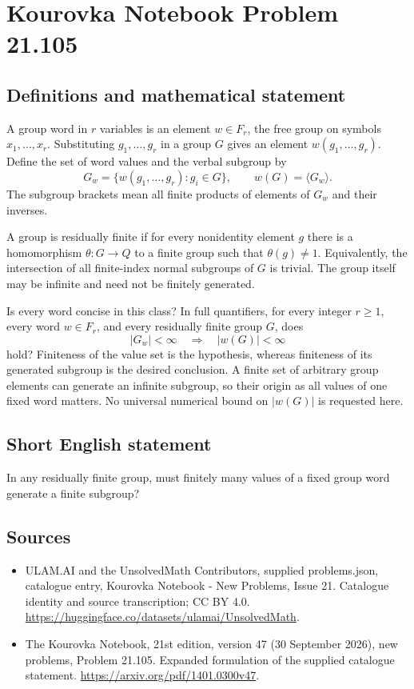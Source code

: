 \documentclass[11pt,a4paper]{article}
\begin{document}
\section*{Kourovka Notebook Problem 21.105}\label{statement}

\subsection{Definitions and mathematical statement}
A group word in $r$ variables is an element $w\in F_r$, the free group on symbols $x_1,\ldots,x_r$. Substituting $g_1,\ldots,g_r$ in a group $G$ gives an element $w(g_1,\ldots,g_r)$. Define the set of word values and the verbal subgroup by
\[
 G_w=\{w(g_1,\ldots,g_r):g_i\in G\},\qquad
 w(G)=\langle G_w\rangle.
\]
The subgroup brackets mean all finite products of elements of $G_w$ and their inverses.

A group is residually finite if for every nonidentity element $g$ there is a homomorphism $\theta:G\to Q$ to a finite group such that $\theta(g)\ne1$. Equivalently, the intersection of all finite-index normal subgroups of $G$ is trivial. The group itself may be infinite and need not be finitely generated.

Is every word concise in this class? In full quantifiers, for every integer $r\ge1$, every word $w\in F_r$, and every residually finite group $G$, does
\[
 |G_w|<\infty\quad\Longrightarrow\quad |w(G)|<\infty
\]
hold? Finiteness of the value set is the hypothesis, whereas finiteness of its generated subgroup is the desired conclusion. A finite set of arbitrary group elements can generate an infinite subgroup, so their origin as all values of one fixed word matters. No universal numerical bound on $|w(G)|$ is requested here.
\subsection{Short English statement}
In any residually finite group, must finitely many values of a fixed group word generate a finite subgroup?
\subsection{Sources}
\begin{itemize}
\item[S1] ULAM.AI and the UnsolvedMath Contributors, supplied problems.json, catalogue entry, Kourovka Notebook - New Problems, Issue 21. Catalogue identity and source transcription; CC BY 4.0.
\url{https://huggingface.co/datasets/ulamai/UnsolvedMath}.
\item[S2] The Kourovka Notebook, 21st edition, version 47 (30 September 2026), new problems, Problem 21.105. Expanded formulation of the supplied catalogue statement.
\url{https://arxiv.org/pdf/1401.0300v47}.
\end{itemize}
\end{document}
